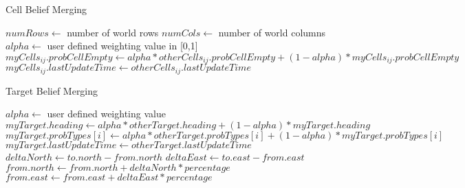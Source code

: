 \begin{algorithm}
	\caption{Cell Belief Merging}
	\label{alg:mergeCell}
	\begin{algorithmic}[1]
		\State $numRows\gets $ number of world rows
		\State $numCols\gets $ number of world columns
		\State $alpha\gets $ user defined weighting value in [0,1]
					\State $myCells_{ij}.probCellEmpty\gets alpha * otherCells_{ij}.probCellEmpty + (1-alpha) * myCells_{ij}.probCellEmpty$
					\State $myCells_{ij}.lastUpdateTime\gets otherCells_{ij}.lastUpdateTime$
				\EndIf
			\EndFor
		\EndFor
		\EndFunction
	\end{algorithmic}
\end{algorithm}

\begin{algorithm}
	\caption{Target Belief Merging}
	\label{alg:mergeTarget}
	\begin{algorithmic}[1]
		\State $alpha\gets $ user defined weighting value
			\State $myTarget.heading\gets alpha * otherTarget.heading + (1-alpha)*myTarget.heading$
			\State {}
				\State $myTarget.probTypes[i]\gets alpha * otherTarget.probTypes[i] + (1-alpha)*myTarget.probTypes[i]$
			\EndFor
			\State $myTarget.lastUpdateTime\gets otherTarget.lastUpdateTime$
		\EndIf
		\EndFunction
		\\
			\State $deltaNorth\gets to.north - from.north$
			\State $deltaEast\gets to.east - from.east$
			\State $from.north\gets from.north + deltaNorth * percentage$
			\State $from.east\gets from.east + deltaEast * percentage$
		\EndFunction
	\end{algorithmic}
\end{algorithm}

